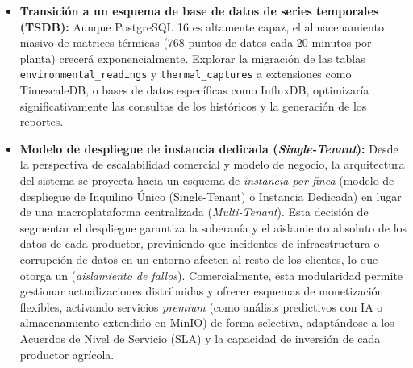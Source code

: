 \begin{itemize}
    \item \textbf{Transición a un esquema de base de datos de series temporales (TSDB):} Aunque PostgreSQL 16 es altamente capaz, el almacenamiento masivo de matrices térmicas (768 puntos de datos cada 20 minutos por planta) crecerá exponencialmente. Explorar la migración de las tablas \texttt{environmental\_readings} y \texttt{thermal\_captures} a extensiones como TimescaleDB, o bases de datos específicas como InfluxDB, optimizaría significativamente las consultas de los históricos y la generación de los reportes.
    
    \item \textbf{Modelo de despliegue de instancia dedicada (\textit{Single-Tenant}):} Desde la perspectiva de escalabilidad comercial y modelo de negocio, la arquitectura del sistema se proyecta hacia un esquema de \textit{instancia por finca} (modelo de despliegue de Inquilino Único (Single-Tenant) o Instancia Dedicada) en lugar de una macroplataforma centralizada (\textit{Multi-Tenant}). Esta decisión de segmentar el despliegue garantiza la soberanía y el aislamiento absoluto de los datos de cada productor, previniendo que incidentes de infraestructura o corrupción de datos en un entorno afecten al resto de los clientes, lo que otorga un (\textit{aislamiento de fallos}). Comercialmente, esta modularidad permite gestionar actualizaciones distribuidas y ofrecer esquemas de monetización flexibles, activando servicios \textit{premium} (como análisis predictivos con IA o almacenamiento extendido en MinIO) de forma selectiva, adaptándose a los Acuerdos de Nivel de Servicio (SLA) y la capacidad de inversión de cada productor agrícola.

\end{itemize}